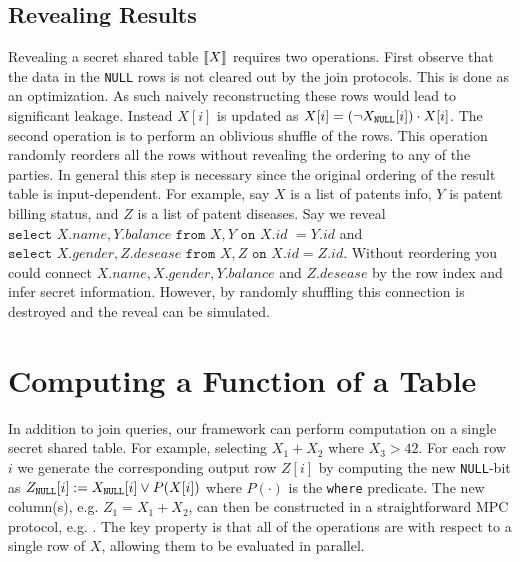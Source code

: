 \subsection{Revealing Results}

Revealing a secret shared table $\llbracket X\rrbracket$ requires two operations. First observe that the data in the \texttt{NULL} rows is not cleared out by the join protocols. This is done as an optimization. As such naively reconstructing these rows would lead to significant leakage. Instead $X[i]$  is updated as $X[i]=(\neg X_\texttt{NULL}[i])\cdot X[i]$. %
The second operation is to perform an oblivious shuffle of the rows. This operation randomly reorders all the rows without revealing the ordering to any of the parties. In general this step is necessary since the original ordering of the result table is input-dependent. For example, say $X$ is a list of patents info, $Y$ is patent billing status, and $Z$ is a list of patent diseases. Say we reveal $\texttt{select } X.name, Y.balance \texttt{ from } X,Y \texttt{ on } X.id$ $=Y.id$ and $\texttt{select } X.gender, Z.desease \texttt{ from } X,Z \texttt{ on } \allowbreak X.id=Z.id$. Without reordering you could connect $X.name, X.gender, Y.balance$ and $Z.desease$ by the row index and infer secret information. However, by randomly shuffling this connection is destroyed and the reveal can be simulated.




\section{Computing a Function of a Table}\label{sec:card}

In addition to join queries, our framework can perform computation on a single secret shared table. For example, selecting $X_1+X_2$  where $X_3>42$. For each row $i$ we generate the corresponding output row $Z[i]$ by computing the new \texttt{NULL}-bit as $Z_\texttt{NULL}[i] := X_\texttt{NULL}[i] \vee P(X[i])$ where $P(\cdot)$ is the \texttt{where} predicate. The new column(s), e.g. $Z_1=X_1+X_2$, can then be constructed in a straightforward MPC protocol, e.g. \cite{aby3,highthroughput}. The key property is that all of the operations are with respect to a single row of $X$, allowing them to be evaluated in parallel. 

